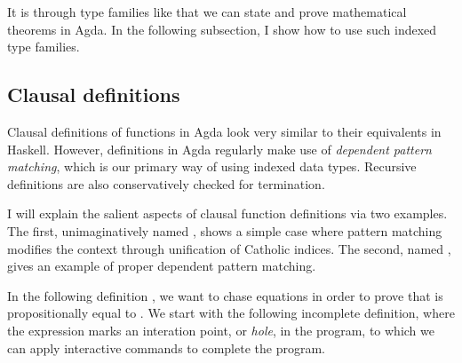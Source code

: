 
It is through type families like \AgdaDatatype{\_$\equiv$\_} that we can state
and prove mathematical theorems in Agda.
In the following subsection, I show how to use such indexed type families.

\subsection{Clausal definitions}

Clausal definitions of functions in Agda look very similar to their equivalents
in Haskell.
However, definitions in Agda regularly make use of
\emph{dependent pattern matching}, which is our primary way of using indexed
data types.
Recursive definitions are also conservatively checked for termination.

I will explain the salient aspects of clausal function definitions via two
examples.
The first, unimaginatively named , shows a simple case where
pattern matching modifies the context through unification of Catholic indices.
The second, named , gives an example of proper
dependent pattern matching.

In the following definition , we want to chase equations in
order to prove that  is propositionally equal to .
We start with the following incomplete definition, where the expression
 marks an interation point, or \emph{hole}, in the program, to
which we can apply interactive commands to complete the program.

\begin{code}
\>[0]\AgdaSpace{}%
\AgdaSymbol{:}\AgdaSpace{}%
\AgdaSpace{}%
\AgdaSymbol{\{}\AgdaSpace{}%
\AgdaSymbol{:}\AgdaSpace{}%
\AgdaSymbol{\}}\AgdaSpace{}%
\AgdaSymbol{\{}\AgdaSpace{}%
\AgdaSpace{}%
\AgdaSpace{}%
\AgdaSymbol{:}\AgdaSpace{}%
\AgdaSymbol{\}}\AgdaSpace{}%
\AgdaSpace{}%
\AgdaSpace{}%
\AgdaSpace{}%
\AgdaSpace{}%
\AgdaSpace{}%
\AgdaSpace{}%
\AgdaSpace{}%
\AgdaSpace{}%
\AgdaSpace{}%
\AgdaSpace{}%
\AgdaSpace{}%
\<%
\\
\>[0]\AgdaSpace{}%
\AgdaSpace{}%
\AgdaSpace{}%
\AgdaSymbol{=}\AgdaSpace{}%
\<%
\end{code}

